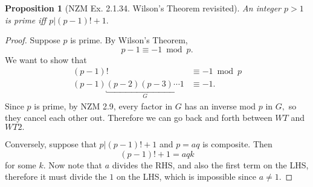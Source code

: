 \documentclass[20pt]{extarticle}
\theoremstyle{plain}
\newtheorem{proposition}[theorem]{Proposition}
\theoremstyle{definition}
\theoremstyle{remark}
\newcommand{\0}{\varnothing}
\newcommand{\<}{\langle}
\renewcommand{\>}{\rangle}
\begin{document}
\begin{proposition}[NZM Ex. 2.1.34. Wilson's Theorem revisited]
An integer $ p > 1 $ is prime iff $ p | (p - 1)! + 1. $
\end{proposition}

\begin{proof}
Suppose $ p $ is prime. By Wilson's Theorem, \[
p - 1 \equiv -1 \bmod p. \tag{WT}
\]
We want to show that \begin{align*}
(p - 1)! &\equiv -1 \bmod p \\
(p - 1) \underbracket{(p - 2)(p - 3) \cdots 1}_{G} &\equiv -1. \tag{WT2}
\end{align*}
Since $ p $ is prime, by NZM 2.9, every factor in $ G $ has an inverse mod $ p $ in $ G, $ so they cancel each other out. Therefore we can go back and forth between $ WT $ and $ WT2. $

Conversely, suppose that $ p | (p - 1)! + 1 $ and $ p = aq $ is composite. Then \[
(p - 1)! + 1 = aqk
\]
for some $ k. $ Now note that $ a $ divides the RHS, and also the first term on the LHS, therefore it must divide the $ 1 $ on the LHS, which is impossible since $ a \neq 1. $
\end{proof}
\end{document}
